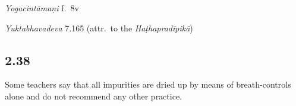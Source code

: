 \begin{ekdosis}
\begin{testimonia}[hp02_037]
\begin{versinnote}
\end{versinnote} 

\emph{Yogacintāmaṇi} f.~8v

\begin{versinnote}
\end{versinnote}

\emph{Yuktabhavadeva} 7.165 (attr.~to the \emph{Haṭhapradīpikā})

\begin{versinnote}
\end{versinnote}
\end{testimonia}


\subsection*{2.38}
\begin{translation}[hp02_038]
Some teachers say that all impurities are dried up by means of breath-controls alone and do not recommend any other practice.
\end{translation}



\end{ekdosis}
